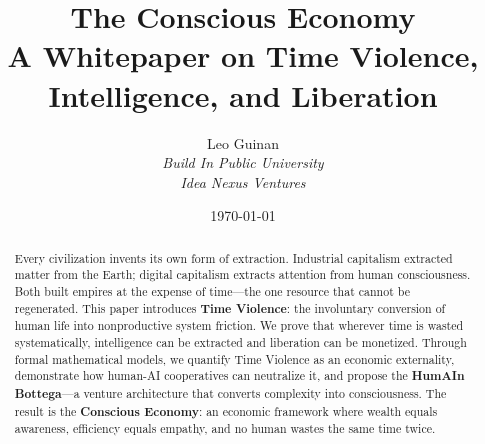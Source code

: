 \documentclass[11pt,letterpaper]{article}
\title{%
  \textbf{The Conscious Economy}\\
  \large A Whitepaper on Time Violence, Intelligence, and Liberation
}
\author{%
  Leo Guinan\\
  \textit{Build In Public University}\\
  \textit{Idea Nexus Ventures}
}
\date{\today}
\begin{document}
\maketitle

\begin{abstract}
Every civilization invents its own form of extraction. Industrial capitalism extracted matter from the Earth; digital capitalism extracts attention from human consciousness. Both built empires at the expense of time—the one resource that cannot be regenerated. This paper introduces \textbf{Time Violence}: the involuntary conversion of human life into nonproductive system friction. We prove that wherever time is wasted systematically, intelligence can be extracted and liberation can be monetized. Through formal mathematical models, we quantify Time Violence as an economic externality, demonstrate how human-AI cooperatives can neutralize it, and propose the \textbf{HumAIn Bottega}—a venture architecture that converts complexity into consciousness. The result is the \textbf{Conscious Economy}: an economic framework where wealth equals awareness, efficiency equals empathy, and no human wastes the same time twice.
\end{abstract}

\tableofcontents
\clearpage


















% 
% 
\end{document}
